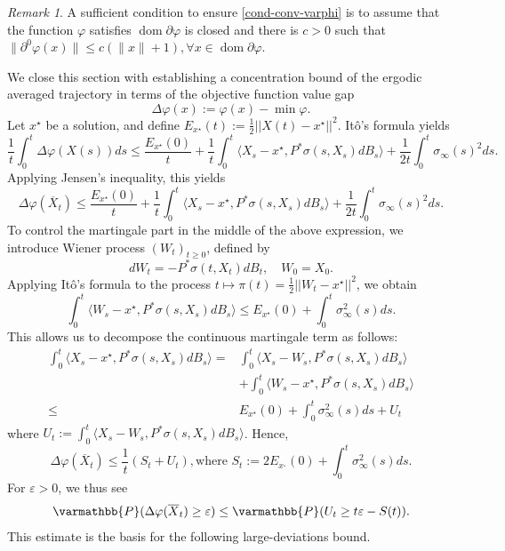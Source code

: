 \documentclass[11pt,reqno]{article}
\let\mathbb=\varmathbb
\newcommand{\dom}{\operatorname{dom}}
\renewcommand{\epsilon}{\varepsilon}
\newcommand{\1}{\mathds{1}}
\newcommand{\Aver}[2]{\overline{#1}_{#2}}
\numberwithin{equation}{section}  %
\theoremstyle{plain}
\theoremstyle{definition}
\theoremstyle{remark}
\newtheorem{remark}{Remark}
\numberwithin{theorem}{section}
\numberwithin{remark}{section}
\numberwithin{example}{section}
\begin{document}
    \begin{remark}
        A sufficient condition to ensure \eqref{cond-conv-varphi} is to assume that the function $\varphi$ satisfies $\dom \partial\varphi$ is closed and there is $c>0$ such that $\|\partial^0\varphi(x)\|\leq c(\|x\|+1), \forall x\in \dom \partial\varphi$. 
    \end{remark}
We close this section with establishing a concentration bound of the ergodic averaged trajectory in terms of the objective function value gap 
$$
\Delta\varphi(x):=\varphi(x)-\min\varphi.
$$
Let $x^{\star}$ be a solution, and define $E_{x^{\star}}(t):=\frac{1}{2}||X(t)-x^{\star}||^{2}$. Itô's formula yields 
$$
\frac{1}{t}\int_{0}^{t}\Delta\varphi(X(s))ds \leq \frac{E_{x^{\star}}(0)}{t}+\frac{1}{t}\int_{0}^{t}\langle X_{s}-x^{\star},P^\ast\sigma(s,X_{s})dB_{s}\rangle+\frac{1}{2t}\int_{0}^{t}\sigma_{\infty}(s)^{2}ds. 
$$
Applying Jensen's inequality, this yields 
$$
\Delta\varphi(\Aver{X}{t})\leq \frac{E_{x^{\star}}(0)}{t}+\frac{1}{t}\int_{0}^{t}\langle X_{s}-x^{\star},P^\ast\sigma(s,X_{s})dB_{s}\rangle+\frac{1}{2t}\int_{0}^{t}\sigma_{\infty}(s)^{2}ds. 
$$
To control the martingale part in the middle of the above expression, we introduce Wiener process $(W_{t})_{t\geq 0}$, defined by 
$$
dW_{t}=-P^\ast\sigma(t,X_{t})dB_{t},\quad W_{0}=X_{0}.
$$
Applying Itô's formula to the process $t\mapsto \pi(t)=\frac{1}{2}||W_{t}-x^{\star}||^{2}$, we obtain 
$$
\int_{0}^{t}\langle W_{s}-x^{\star},P^\ast\sigma(s,X_{s})dB_{s}\rangle \leq E_{x^{\star}}(0)+\int_{0}^{t}\sigma^{2}_{\infty}(s)ds.
$$
This allows us to decompose the continuous martingale term as follows:
\begin{align*}
\int_{0}^{t}\langle X_{s}-x^{\star},P^\ast\sigma(s,X_{s})dB_{s}\rangle=&\int_{0}^{t}\langle X_{s}-W_{s},P^\ast\sigma(s,X_{s})dB_{s}\rangle\\
&+\int_{0}^{t}\langle W_{s}-x^{\star},P^\ast\sigma(s,X_{s})dB_{s}\rangle\\
\leq &E_{x^{\star}}(0)+\int_{0}^{t}\sigma^{2}_{\infty}(s)ds+U_{t}
\end{align*}
where $U_{t}:=\int_{0}^{t}\langle X_{s}-W_{s},P^\ast\sigma(s,X_{s})dB_{s}\rangle$. Hence, 
$$
\Delta\varphi(\Aver{X}{t})\leq\frac{1}{t}(S_{t}+U_{t}),\text{where }S_{t}:=2E_{x_{^{*}}}(0)+\int_{0}^{t}\sigma^{2}_{\infty}(s) ds.
$$
For $\epsilon>0$, we thus see 
$$
\mathbb{P}(\Delta\varphi(\Aver{X}{t})\geq\epsilon)\leq\mathbb{P}(U_{t}\geq t\epsilon-S(t)).
$$
This estimate is the basis for the following large-deviations bound.
\end{document}
